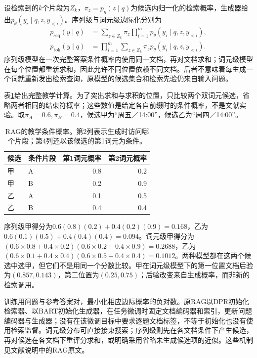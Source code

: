 设检索到的$k$个片段为$Z_k$，$\pi_z=p_\eta(z\mid q)$为候选内归一化的检索概率，生成器给出$p_\theta(y_i\mid q,z,y_{<i})$。序列级与词元级边际化分别为
\begin{equation}
\begin{aligned}
 p_{\mathrm{seq}}(y\mid q)
 &=\sum_{z\in Z_k}\pi_z
      \prod_{i=1}^{m}p_\theta(y_i\mid q,z,y_{<i}),\\
 p_{\mathrm{tok}}(y\mid q)
 &=\prod_{i=1}^{m}
      \sum_{z\in Z_k}\pi_z p_\theta(y_i\mid q,z,y_{<i}).
\end{aligned}
\label{eq:nlp-dialogue-rag}
\end{equation}
序列级模型在一次完整答案条件概率内使用同一文档，再对文档求和；词元级模型在每个位置都重新求和，因此允许不同位置依赖不同文档。后者不意味着每生成一个词就重新发出检索查询，原模型的候选集合和检索先验仍来自输入问题。

表\ref{tab:nlp-dialogue-rag}给出完整教学计算。为了突出求和与求积的位置，只比较两个双词元候选，省略两者相同的结束符概率；这些数值是给定各自前缀时的条件概率，不是文献实验。取$\pi_A=0.6,\pi_B=0.4$，候选甲为“周五／14:00”，候选乙为“周四／14:00”。

\begin{table}[htbp]
  \centering
  \begin{tabular}{llrr}
    \toprule
    候选 & 条件片段 & 第1词元概率 & 第2词元概率\\
    \midrule
    甲 & A & 0.8 & 0.2\\
    甲 & B & 0.2 & 0.9\\
    乙 & A & 0.1 & 0.5\\
    乙 & B & 0.4 & 0.4\\
    \bottomrule
  \end{tabular}
  \caption{RAG的教学条件概率。第2列表示生成时访问哪个片段；第4列还以该候选的第1词元为条件。}
  \label{tab:nlp-dialogue-rag}
\end{table}

序列级甲得分为$0.6(0.8)(0.2)+0.4(0.2)(0.9)=0.168$，乙为$0.6(0.1)(0.5)+0.4(0.4)(0.4)=0.094$。词元级甲得分为$(0.6\times0.8+0.4\times0.2)(0.6\times0.2+0.4\times0.9)=0.2688$，乙为$(0.6\times0.1+0.4\times0.4)(0.6\times0.5+0.4\times0.4)=0.1012$。两种模型都在这两个候选中选甲，但它们不是用同一个分数比较。甲在词元级模型下的第一位置文档后验为$(0.857,0.143)$，第二位置为$(0.25,0.75)$；后验改变来自生成概率，而非新的检索调用。

训练用问题与参考答案对，最小化相应边际概率的负对数。原RAG以DPR初始化检索器、以BART初始化生成器，在任务微调时固定文档编码器和索引，更新问题编码器与生成器；没有在该微调目标中要求逐题文档标签，不等于初始化也没有使用检索监督。词元级分布可直接接束搜索；序列级则先在各文档条件下产生候选，再对候选在各文档下重评分求和，或明确采用省略未生成候选项的近似。这些机制见文献说明中的RAG原文。

